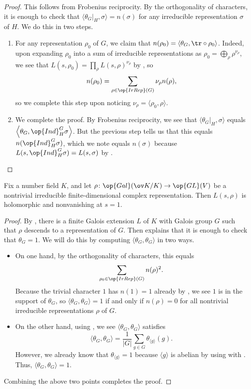 \documentclass[../thesis.tex]{subfiles}
\begin{document}
\begin{proof}
	This follows from Frobenius reciprocity. By the orthogonality of characters, it is enough to check that $\langle\theta_G|_H,\sigma\rangle=n(\sigma)$ for any irreducible representation $\sigma$ of $H$. We do this in two steps.
	\begin{enumerate}
		\item For any representation $\rho_0$ of $G$, we claim that $n(\rho_0)=\langle\theta_G,{\tr}\circ\rho_0\rangle$. Indeed, upon expanding $\rho_0$ into a sum of irreducible representations as $\rho_0=\bigoplus_\rho\rho^{\nu_\rho}$, we see that $L(s,\rho_0)=\prod_\rho L(s,\rho)^{\nu_\rho}$ by , so
		\[n(\rho_0)=\sum_{\rho\in\op{IrRep}(G)}\nu_\rho n(\rho),\]
		so we complete this step upon noticing $\nu_\rho=\langle\rho_0,\rho\rangle$.
		\item We complete the proof. By Frobenius reciprocity, we see that $\langle\theta_G|_H,\sigma\rangle$ equals $\left\langle\theta_G,\op{Ind}_H^G\sigma\right\rangle$. But the previous step tells us that this equals $n(\op{Ind}_H^G\sigma)$, which we note equals $n(\sigma)$ because $L(s,\op{Ind}_H^G\sigma)=L(s,\sigma)$ by .
		\qedhere
	\end{enumerate}
\end{proof}
\begin{proposition} \label{prop:artin-nonvanish}
	Fix a number field $K$, and let $\rho\colon\op{Gal}(\ov K/K)\to\op{GL}(V)$ be a nontrivial irreducible finite-dimensional complex representation. Then $L(s,\rho)$ is holomorphic and nonvanishing at $s=1$.
\end{proposition}
\begin{proof}
	By , there is a finite Galois extension $L$ of $K$ with Galois group $G$ such that $\rho$ descends to a representation of $G$. Then  explains that it is enough to check that $\theta_G=1$. We will do this by computing $\langle\theta_G,\theta_G\rangle$ in two ways.
	\begin{itemize}
		\item On one hand, by the orthogonality of characters, this equals
		\[\sum_{\rho_0\in\op{IrRep}(G)}n(\rho)^2.\]
		Because the trivial character $1$ has $n(1)=1$ already by , we see $1$ is in the support of $\theta_G$, so $\langle\theta_G,\theta_G\rangle=1$ if and only if $n(\rho)=0$ for all nontrivial irreducible representations $\rho$ of $G$.
		\item On the other hand, using , we see $\langle\theta_G,\theta_G\rangle$ satisfies
		\[\langle\theta_G,\theta_G\rangle=\frac1{\left|G\right|}\sum_{g\in G}\theta_{\langle g\rangle}(g).\]
		However, we already know that $\theta_{\langle g\rangle}=1$ because $\langle g\rangle$ is abelian by using  with . Thus, $\langle\theta_G,\theta_G\rangle=1$.
	\end{itemize}
	Combining the above two points completes the proof.
\end{proof}
\end{document}

